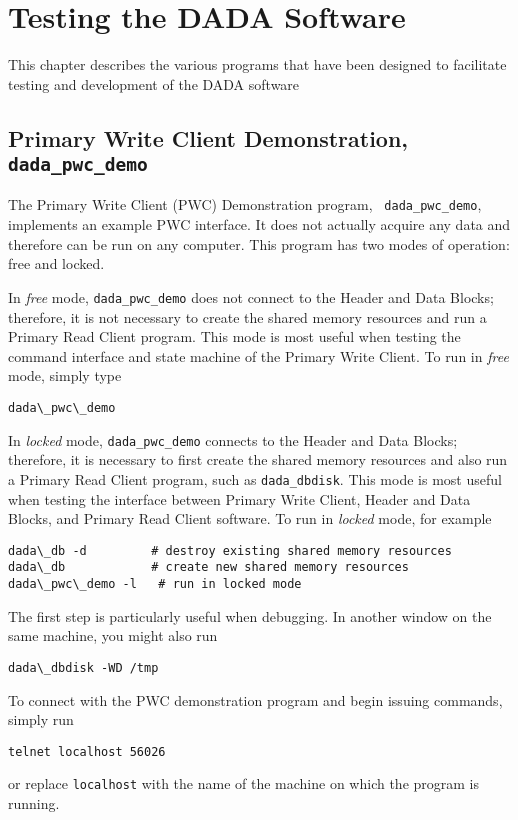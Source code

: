 \chapter{Testing the DADA Software}
\label{app:software}

This chapter describes the various programs that have been designed to
facilitate testing and development of the DADA software

\section{Primary Write Client Demonstration, {\tt dada\_pwc\_demo}}

The Primary Write Client (PWC) Demonstration program, {\tt
dada\_pwc\_demo}, implements an example PWC interface.  It does not
actually acquire any data and therefore can be run on any computer.
This program has two modes of operation: free and locked.

In {\em free} mode, {\tt dada\_pwc\_demo} does not connect to the
Header and Data Blocks; therefore, it is not necessary to create the
shared memory resources and run a Primary Read Client program.  This
mode is most useful when testing the command interface and state
machine of the Primary Write Client.  To run in {\em free} mode,
simply type
\begin{verbatim}
dada\_pwc\_demo
\end{verbatim}

In {\em locked} mode, {\tt dada\_pwc\_demo} connects to the Header and
Data Blocks; therefore, it is necessary to first create the shared
memory resources and also run a Primary Read Client program, such as
{\tt dada\_dbdisk}.  This mode is most useful when testing the
interface between Primary Write Client, Header and Data Blocks, and
Primary Read Client software.  To run in {\em locked} mode, for
example
\begin{verbatim}
dada\_db -d         # destroy existing shared memory resources
dada\_db            # create new shared memory resources
dada\_pwc\_demo -l   # run in locked mode
\end{verbatim}
The first step is particularly useful when debugging.
In another window on the same machine, you might also run
\begin{verbatim}
dada\_dbdisk -WD /tmp
\end{verbatim}

To connect with the PWC demonstration program and begin issuing
commands, simply run
\begin{verbatim}
telnet localhost 56026
\end{verbatim}
or replace {\tt localhost} with the name of the machine on which the
program is running.


